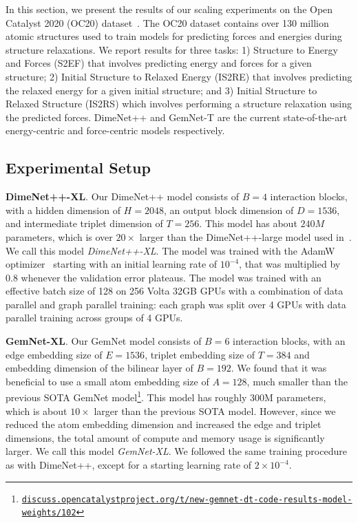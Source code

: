 \documentclass{article} \usepackage{iclr2022_conference,times}
\begin{document}
In this section, we present the results of our scaling experiments on the Open Catalyst 2020 (OC20) dataset~\citep{OC20}. The OC20 dataset contains over 130 million atomic structures used to train models for predicting forces and energies during structure relaxations. We report results for three tasks: 1) Structure to Energy and Forces (S2EF) that involves predicting energy and forces for a given structure; 2) Initial Structure to Relaxed Energy (IS2RE) that involves predicting the relaxed energy for a given initial structure; and 3) Initial Structure to Relaxed Structure (IS2RS) which involves performing a structure relaxation using the predicted forces. DimeNet++ and GemNet-T are the current state-of-the-art energy-centric and force-centric models respectively.

\subsection{Experimental Setup}

\textbf{DimeNet++-XL}. Our DimeNet++ model consists of $B=4$ interaction blocks, with a hidden dimension of $H = 2048$, an output block dimension of $D = 1536$, and intermediate triplet dimension of $T = 256$. This model has about $240M$ parameters, which is over $20\times$ larger than the DimeNet++-large model used in~\citep{OC20}. We call this model \emph{DimeNet++-XL}. The model was trained with the AdamW optimizer~\citep{kingma2014adam,loshchilov2019decoupled} starting with an initial learning rate of $10^{-4}$, that was multiplied by $0.8$ whenever the validation error plateaus. The model was trained with an effective batch size of 128 on 256 Volta 32GB GPUs with a combination of data parallel and graph parallel training: each graph was split over 4 GPUs with data parallel training across groups of 4 GPUs.

\textbf{GemNet-XL}. Our GemNet model consists of $B = 6$ interaction blocks, with an edge embedding size of $E=1536$, triplet embedding size of $T=384$ and embedding dimension of the bilinear layer of $B=192$. We found that it was beneficial to use a small atom embedding size of $A=128$, much smaller than the previous SOTA GemNet model\footnote{\href{https://discuss.opencatalystproject.org/t/new-gemnet-dt-code-results-model-weights/102}{\tt discuss.opencatalystproject.org/t/new-gemnet-dt-code-results-model-weights/102}}. This model has roughly 300M parameters, which is about $10\times$ larger than the previous SOTA model. However, since we reduced the atom embedding dimension and increased the edge and triplet dimensions, the total amount of compute and memory usage is significantly larger. We call this model \emph{GemNet-XL}. We followed the same training procedure as with DimeNet++, except for a starting learning rate of $2\times10^{-4}$.
\end{document}
